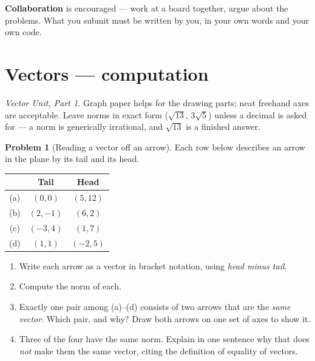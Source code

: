 \documentclass[11pt]{article}
\theoremstyle{definition}
\newtheorem{prob}{Problem}[section]
\begin{document}
\medskip
\noindent\textbf{Collaboration} is encouraged --- work at a board together, argue
about the problems. What you submit must be written by you, in your own words
and your own code.

\section{Vectors --- computation}
\emph{Vector Unit, Part 1.} Graph paper helps for the drawing parts; neat
freehand axes are acceptable. Leave norms in exact form ($\sqrt{13}$,
$3\sqrt{5}$) unless a decimal is asked for --- a norm is generically irrational,
and $\sqrt{13}$ is a finished answer.

\begin{prob}[Reading a vector off an arrow]
Each row below describes an arrow in the plane by its tail and its head.

\begin{center}
\renewcommand{\arraystretch}{1.2}
\begin{tabular}{@{}c c c@{}}
\toprule
 & \textbf{Tail} & \textbf{Head} \\
\midrule
(a) & $(0,0)$   & $(5,12)$  \\
(b) & $(2,-1)$  & $(6,2)$   \\
(c) & $(-3,4)$  & $(1,7)$   \\
(d) & $(1,1)$   & $(-2,5)$  \\
\bottomrule
\end{tabular}
\end{center}

\begin{enumerate}[label=\textbf{(\roman*)},leftmargin=2.6em,itemsep=7pt,topsep=6pt]
  \item Write each arrow as a vector in bracket notation, using
        \emph{head minus tail}.
  \item Compute the norm of each.
  \item Exactly one pair among (a)--(d) consists of two arrows that are the
        \emph{same vector}. Which pair, and why? Draw both arrows on one set of
        axes to show it.
  \item Three of the four have the same norm. Explain in one sentence why that
        does \emph{not} make them the same vector, citing the definition of
        equality of vectors.
\end{enumerate}
\end{prob}
\end{document}
